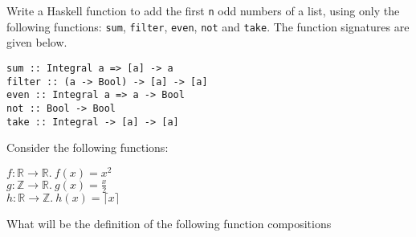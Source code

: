 \documentclass[]{exam}
\begin{document}
  \begin{center}
  \end{center}

  \begin{questions}
    \question Write a Haskell function to add the first \texttt{n} odd numbers
      of a list, using only the following functions: \texttt{sum},
      \texttt{filter}, \texttt{even}, \texttt{not} and \texttt{take}. The
      function signatures are given below.

      \texttt{sum :: Integral a => [a] -> a}\\
      \texttt{filter :: (a -> Bool) -> [a] -> [a]}\\
      \texttt{even :: Integral a => a -> Bool}\\
      \texttt{not :: Bool -> Bool}\\
      \texttt{take :: Integral -> [a] -> [a]}


    \question Consider the following functions:

      $f: \mathbb{R} \rightarrow \mathbb{R}.~f(x)=x^2$\\
      $g: \mathbb{Z} \rightarrow \mathbb{R}.~g(x)=\frac{x}{2}$\\
      $h: \mathbb{R} \rightarrow \mathbb{Z}.~h(x)=\lceil x \rceil$

      \bigskip

      What will be the definition of the following function compositions

\end{questions}
\end{document}
